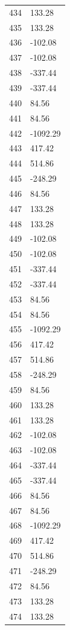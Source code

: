 \documentclass[a4paper,11pt]{article}
\begin{document}
\begin{center}
\begin{longtable}{|R{1.5cm}|R{2.5cm}|}
  434 &       133.28 \\
  435 &       133.28 \\
  436 &      -102.08 \\
  437 &      -102.08 \\
  438 &      -337.44 \\
  439 &      -337.44 \\
  440 &        84.56 \\
  441 &        84.56 \\
  442 &     -1092.29 \\
  443 &       417.42 \\
  444 &       514.86 \\
  445 &      -248.29 \\
  446 &        84.56 \\
  447 &       133.28 \\
  448 &       133.28 \\
  449 &      -102.08 \\
  450 &      -102.08 \\
  451 &      -337.44 \\
  452 &      -337.44 \\
  453 &        84.56 \\
  454 &        84.56 \\
  455 &     -1092.29 \\
  456 &       417.42 \\
  457 &       514.86 \\
  458 &      -248.29 \\
  459 &        84.56 \\
  460 &       133.28 \\
  461 &       133.28 \\
  462 &      -102.08 \\
  463 &      -102.08 \\
  464 &      -337.44 \\
  465 &      -337.44 \\
  466 &        84.56 \\
  467 &        84.56 \\
  468 &     -1092.29 \\
  469 &       417.42 \\
  470 &       514.86 \\
  471 &      -248.29 \\
  472 &        84.56 \\
  473 &       133.28 \\
  474 &       133.28 \\

\end{longtable}
\end{center}
\end{document}
